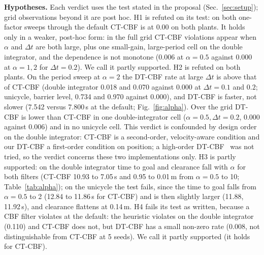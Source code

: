 \textbf{Hypotheses.} Each verdict uses the test stated in the proposal (Sec.~\ref{sec:setup}); grid observations beyond it are post hoc.
H1 is refuted on its test: on both one-factor sweeps through the default CT-CBF is at 0.00 on both plants. It holds only in a weaker, post-hoc form: in the full grid CT-CBF violations appear when $\alpha$ and $\Delta t$ are both large, plus one small-gain, large-period cell on the double integrator, and the dependence is not monotone (0.006 at $\alpha=0.5$ against 0.000 at $\alpha=1,2$ for $\Delta t=0.2$). We call it partly supported.
H2 is refuted on both plants. On the period sweep at $\alpha=2$ the DT-CBF rate at large $\Delta t$ is above that of CT-CBF (double integrator 0.018 and 0.070 against 0.000 at $\Delta t=0.1$ and $0.2$; unicycle, barrier level, 0.734 and 0.970 against 0.000), and DT-CBF is faster, not slower (7.542 versus 7.800\,s at the default; Fig.~\ref{fig:alpha}). Over the grid DT-CBF is lower than CT-CBF in one double-integrator cell ($\alpha=0.5,\Delta t=0.2$, 0.000 against 0.006) and in no unicycle cell. This verdict is confounded by design order on the double integrator: CT-CBF is a second-order, velocity-aware condition and our DT-CBF a first-order condition on position; a high-order DT-CBF~\cite{xiong2023discrete} was not tried, so the verdict concerns these two implementations only.
H3 is partly supported: on the double integrator time to goal and clearance fall with $\alpha$ for both filters (CT-CBF 10.93 to 7.05\,s and 0.95 to 0.01\,m from $\alpha=0.5$ to 10; Table~\ref{tab:alpha}); on the unicycle the test fails, since the time to goal falls from $\alpha=0.5$ to 2 (12.84 to 11.86\,s for CT-CBF) and is then slightly larger (11.88, 11.92\,s), and clearance flattens at 0.14\,m.
H4 fails its test as written, because a CBF filter violates at the default: the heuristic violates on the double integrator (0.110) and CT-CBF does not, but DT-CBF has a small non-zero rate (0.008, not distinguishable from CT-CBF at 5 seeds). We call it partly supported (it holds for CT-CBF).
